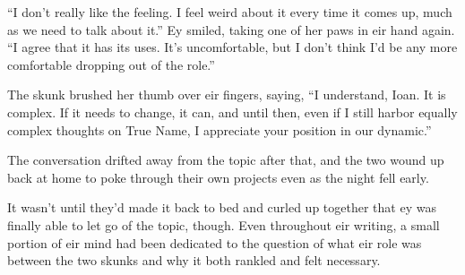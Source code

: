 ``I don't really like the feeling. I feel weird about it every time it comes up, much as we need to talk about it.'' Ey smiled, taking one of her paws in eir hand again. ``I agree that it has its uses. It's uncomfortable, but I don't think I'd be any more comfortable dropping out of the role.''

The skunk brushed her thumb over eir fingers, saying, ``I understand, Ioan. It is complex. If it needs to change, it can, and until then, even if I still harbor equally complex thoughts on True Name, I appreciate your position in our dynamic.''

The conversation drifted away from the topic after that, and the two wound up back at home to poke through their own projects even as the night fell early.

It wasn't until they'd made it back to bed and curled up together that ey was finally able to let go of the topic, though. Even throughout eir writing, a small portion of eir mind had been dedicated to the question of what eir role was between the two skunks and why it both rankled and felt necessary.
